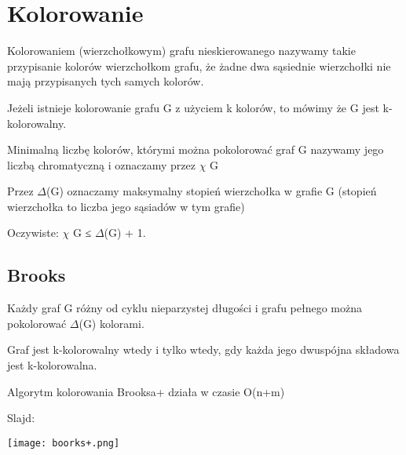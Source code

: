 \section{Kolorowanie}

\entry
Kolorowaniem (wierzchołkowym) grafu nieskierowanego nazywamy takie przypisanie kolorów
wierzchołkom grafu, że żadne dwa sąsiednie wierzchołki nie mają przypisanych tych samych kolorów.

\entry
Jeżeli istnieje kolorowanie grafu G z użyciem k kolorów, to mówimy że G jest k-kolorowalny.

\entry
Minimalną liczbę kolorów, którymi można pokolorować graf G nazywamy jego liczbą chromatyczną i
oznaczamy przez $\chi$  G 

\entry
Przez $\Delta $(G) oznaczamy maksymalny stopień wierzchołka w grafie G (stopień wierzchołka to liczba
jego sąsiadów w tym grafie)

\entry
Oczywiste: $\chi$ G ≤ $\Delta $(G) + 1.

\subsection{Brooks}

\entry
Każdy graf G różny od cyklu nieparzystej długości i grafu pełnego można pokolorować $\Delta $(G) kolorami.

\entry
Graf jest k-kolorowalny wtedy i tylko wtedy, gdy każda jego dwuspójna składowa jest k-kolorowalna.

\entry
Algorytm kolorowania Brooksa+ działa w czasie O(n+m)

\entry
Slajd:

\texttt{[image: boorks+.png]}
